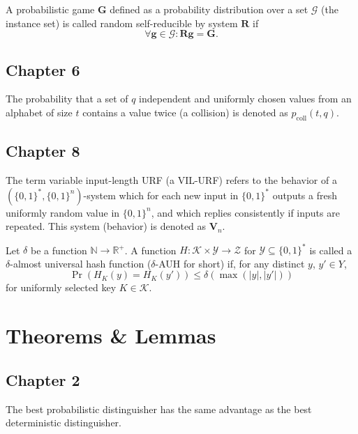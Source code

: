 \documentclass[a4paper,german]{article}
\newenvironment{customdef}[1]{\renewcommand\theinnercustomdef{#1}\innercustomdef}{\endinnercustomdef}
\newenvironment{customlem}[1]{\renewcommand\theinnercustomlem{#1}\innercustomlem}{\endinnercustomlem}
\begin{document}
\begin{customdef}{5.4}
  A probabilistic game $\mathbf{G}$ defined as a probability distribution over a set $\mathcal{G}$ (the instance set) is called random self-reducible by system $\mathbf{R}$ if
  \[
	  \forall \mathbf{g} \in \mathcal{G} :  \mathbf{R}\mathbf{g} = \mathbf{G}
  .\]
\end{customdef}







\subsection*{Chapter 6}
\begin{customdef}{6.35}
  The probability that a set of $q$ independent and uniformly chosen values from an alphabet of size $t$ contains a value twice (a collision) is denoted as $p_{\mathrm{coll}}(t,q)$.
\end{customdef}

\subsection*{Chapter 8}

\begin{customdef}{8.2}
  The term variable input-length URF (a VIL-URF) refers to the behavior of a $(\{0,1\}^*,\{0,1\}^n)$-system which for each new input in $\{0,1\}^*$ outputs a fresh uniformly random value in $\{0,1\}^n$, and which replies consistently if inputs are repeated. This system (behavior) is denoted as $\mathbf{V}_n$.
\end{customdef}

\begin{customdef}{8.3}
  Let $\delta$ be a function $\mathbb{N} \rightarrow \mathbb{R}^+$. A function $H : \mathcal{K} \times \mathcal{Y} \rightarrow \mathcal{Z}$ for $\mathcal{Y} \subseteq \{0,1\}^{*}$ is called a $\delta$-almost universal hash function ($\delta$-AUH for short) if, for any distinct $y$, $y' \in Y$,
  \[
		\Pr(H_K(y) = H_K(y')) \leq \delta(\max(|y|, |y'|))
	\]
  for uniformly selected key $K \in \mathcal{K}$.
\end{customdef}


\section*{Theorems \& Lemmas}
\subsection*{Chapter 2}
\begin{customlem}{2.0}
	The best probabilistic distinguisher has the same advantage as the best deterministic distinguisher.
\end{customlem}
\end{document}

